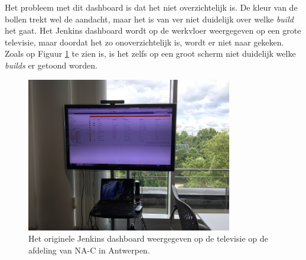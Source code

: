 \documentclass[10pt,a4paper]{article}
\begin{document}
Het probleem met dit dashboard is dat het niet overzichtelijk is. De kleur van de bollen trekt wel de aandacht, maar het is van ver niet duidelijk over welke \textit{build} het gaat. Het Jenkins dashboard wordt op de werkvloer weergegeven op een grote televisie, maar doordat het zo onoverzichtelijk is, wordt er niet naar gekeken. Zoals op Figuur \ref{tv_1} te zien is, is het zelfs op een groot scherm niet duidelijk welke \textit{builds} er getoond worden.

\begin{figure}[ht!]
\centering
\includegraphics[width=90mm]{tvdashboardoriginal.jpg}
\caption{Het originele Jenkins dashboard weergegeven op de televisie op de afdeling van NA-C in Antwerpen.} 
\label{tv_1}
\end{figure}
\end{document}
